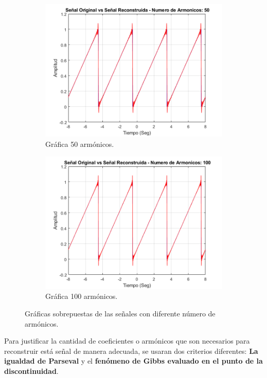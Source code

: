 \documentclass[11pt,a4paper,twocolumn]{article}
\begin{document}
\begin{figure}[H]
\begin{subfigure}[h]{0.45\linewidth}
            \includegraphics[width=\linewidth]{img/figure4_C.png}
            \caption{Gráfica 50 armónicos.}
            \label{figure4_C}
        \end{subfigure}
        \begin{subfigure}[h]{0.45\linewidth}
            \includegraphics[width=\linewidth]{img/figure4_D.png}
            \caption{Gráfica 100 armónicos.}
            \label{figure4_D}
        \end{subfigure}
        \caption{Gráficas sobrepuestas de las señales con diferente número de armónicos.}
        \label{figure4}
    \end{figure}

    Para justificar la cantidad de coeficientes o armónicos que son necesarios para reconstruir está 
    señal de manera adecuada, se usaran dos criterios diferentes: \textbf{La igualdad de Parseval} y el 
    \textbf{fenómeno de Gibbs evaluado en el punto de la discontinuidad}.
    
\end{document}
